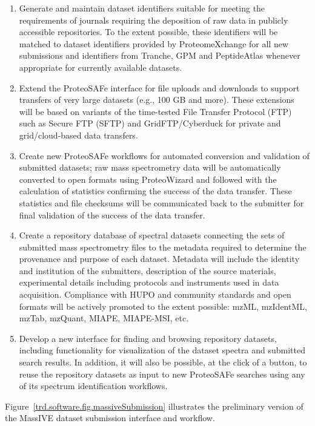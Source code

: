 \documentclass[arial,11pt]{article}
\begin{document}
\begin{enumerate}
\item Generate and maintain dataset identifiers suitable for meeting the requirements of journals requiring the deposition of raw data in publicly accessible repositories. To the extent possible, these identifiers will be matched to dataset identifiers provided by ProteomeXchange for all new submissions and identifiers from Tranche, GPM and PeptideAtlas whenever appropriate for currently available datasets.

\item Extend the ProteoSAFe interface for file uploads and downloads to support transfers of very large datasets (e.g., 100 GB and more). These extensions will be based on variants of the time-tested File Transfer Protocol (FTP) such as Secure FTP (SFTP) and GridFTP/Cyberduck for private and grid/cloud-based data transfers.

\item Create new ProteoSAFe workflows for automated conversion and validation of submitted datasets; raw mass spectrometry data will be automatically converted to open formats using ProteoWizard and followed with the calculation of statistics confirming the success of the data transfer. These statistics and file checksums will be communicated back to the submitter for final validation of the success of the data transfer.

\item Create a repository database of spectral datasets connecting the sets of submitted mass spectrometry files to the metadata required to determine the provenance and purpose of each dataset. Metadata will include the identity and institution of the submitters, description of the source materials, experimental details including protocols and instruments used in data acquisition. Compliance with HUPO and community standards and open formats will be actively promoted to the extent possible: mzML, mzIdentML, mzTab, mzQuant, MIAPE, MIAPE-MSI, etc.

\item Develop a new interface for finding and browsing repository datasets, including functionality for visualization of the dataset spectra and submitted search results.  In addition, it will also be possible, at the click of a button, to reuse the repository datasets as input to new ProteoSAFe searches using any of its spectrum identification workflows.
\end{enumerate}

Figure~\ref{trd.software.fig.massiveSubmission} illustrates the preliminary version of the MassIVE dataset submission interface and workflow.
\end{document}
